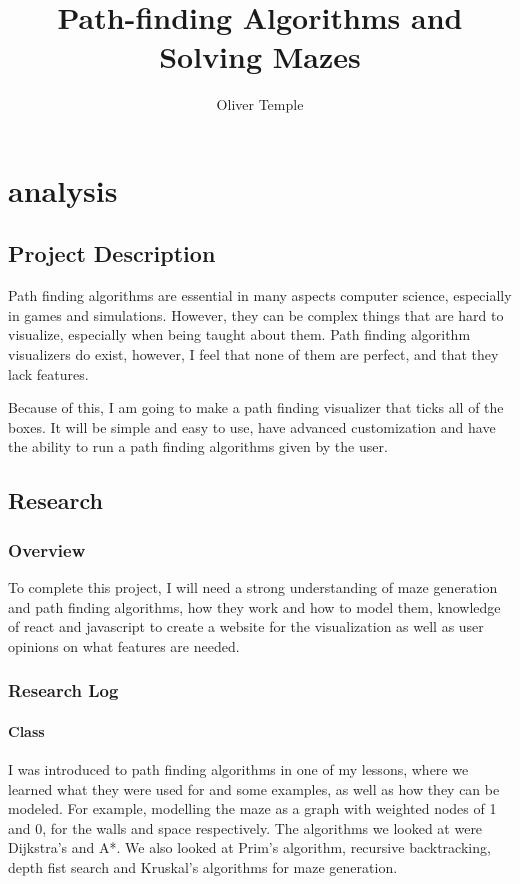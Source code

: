 \documentclass{article}
\title{Path-finding Algorithms and Solving Mazes}
\author{Oliver Temple}
\begin{document}
\maketitle
\tableofcontents

\section{analysis}
\subsection{Project Description}
Path finding algorithms are essential in many aspects computer science, especially in games and simulations. However, they can be complex things that are hard to visualize, especially when being taught about them. Path finding algorithm visualizers do exist, however, I feel that none of them are perfect, and that they lack features.

Because of this, I am going to make a path finding visualizer that ticks all of the boxes. It will be simple and easy to use, have advanced customization and have the ability to run a path finding algorithms given by the user.

\subsection{Research}
\subsubsection{Overview}
To complete this project, I will need a strong understanding of maze generation and path finding algorithms, how they work and how to model them, knowledge of react and javascript to create a website for the visualization as well as user opinions on what features are needed.
\subsubsection{Research Log}
\paragraph*{Class}
I was introduced to path finding algorithms in one of my lessons, where we learned what they were used for and some examples, as well as how they can be modeled. For example, modelling the maze as a graph with weighted nodes of 1 and 0, for the walls and space respectively. The algorithms we looked at were Dijkstra's and A*. We also looked at Prim's algorithm, recursive backtracking, depth fist search and Kruskal's algorithms for maze generation.
\end{document}
